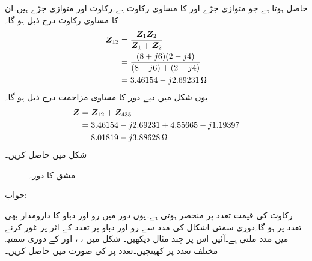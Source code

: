 حاصل ہوتا ہے جو متوازی جڑے  اور  کا مساوی رکاوٹ ہے۔رکاوٹ  اور  متوازی جڑے ہیں۔ان کا مساوی رکاوٹ درج ذیل ہو گا۔
\begin{align*}
{\ensuremath{{\boldsymbol{Z}}}}_{12}&=\frac{{{\boldsymbol{Z}}}_1 {{\boldsymbol{Z}}}_2}{{{\boldsymbol{Z}}}_1+{{\boldsymbol{Z}}}_2}\\
&=\frac{(8+j6)(2-j4)}{(8+j6)+(2-j4)}\\
&=3.46154-j2.69231 \, \si{\ohm}
\end{align*}
یوں شکل  میں دیے دور کا مساوی مزاحمت درج ذیل ہو گا۔
\begin{align*}
{\ensuremath{{\boldsymbol{Z}}}}&={{\boldsymbol{Z}}}_{12}+{{\boldsymbol{Z}}}_{435}\\
&=3.46154-j2.69231+4.55665-j1.19397\\
&=8.01819-j3.88628 \, \si{\ohm}
\end{align*}
شکل  میں  حاصل کریں۔
\begin{figure}
\centering
{}
\caption{مشق  کا دور۔}
\label{شکل_بدلتا_متعدد_متوازی_رکاوٹ_مساوی_الف}
\end{figure}

جواب:

رکاوٹ کی قیمت تعدد پر منحصر ہوتی ہے۔یوں دور میں رو اور دباو کا دارومدار بھی تعدد پر ہو گا۔دوری سمتی اشکال کی مدد سے رو اور دباو پر تعدد کے اثر پر غور کرنے میں مدد ملتی ہے۔آئیں اس پر چند مثال دیکھیں۔
شکل  میں ، ،  اور  کے دوری سمتیہ مختلف تعدد پر  کھینچیں۔تعدد  پر  کی صورت میں  حاصل کریں۔

